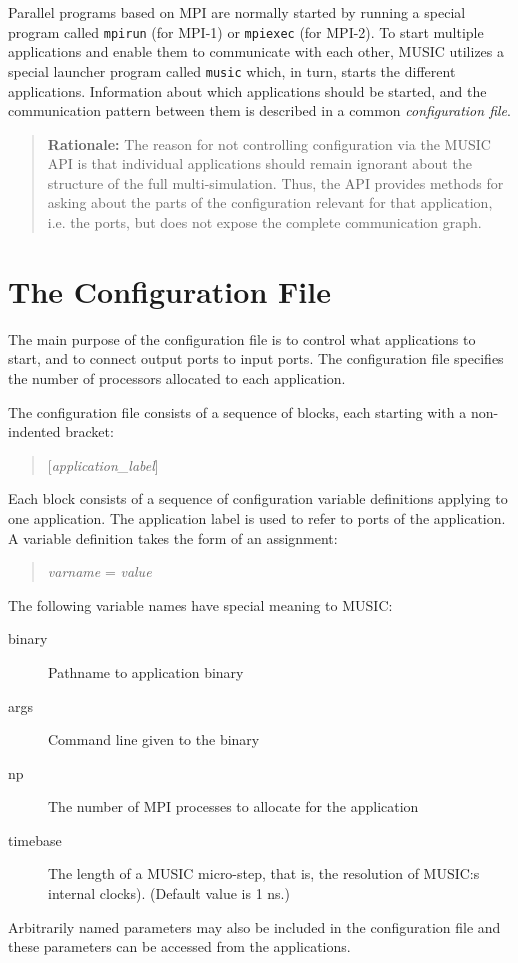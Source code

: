 \documentclass[a4paper]{report}
\newenvironment{rationale}%
{\par\begin{quote}\textbf{Rationale:}}%
{\par\end{quote}}
\begin{document}
Parallel programs based on MPI are normally started by running a
special program called \texttt{mpirun} (for MPI-1) or
\texttt{mpiexec} (for MPI-2).  To start multiple
applications and enable them to communicate with each other, MUSIC
utilizes a special launcher program called \texttt{music}
which, in turn, starts the different applications.  Information about
which applications should be started, and the communication pattern
between them is described in a common \emph{configuration
  file}.

\begin{rationale}
  The reason for not controlling configuration via the MUSIC API is
  that individual applications should remain ignorant about the
  structure of the full multi-simulation.  Thus, the API provides
  methods for asking about the parts of the configuration relevant for
  that application, i.e. the ports, but does not expose the complete
  communication graph.
\end{rationale}


\section{The Configuration File}

The main purpose of the configuration file is to control what
applications to start, and to connect output ports to input ports.
The configuration file specifies the number of processors allocated to
each application.

The configuration file consists of a sequence of blocks, each starting
with a non-indented bracket:

\begin{quote}
  [\emph{application\_label}]
\end{quote}

\noindent Each block consists of a sequence of configuration variable
definitions applying to one application.  The application label is
used to refer to ports of the application.  A variable definition
takes the form of an assignment:

\begin{quote}
  \emph{varname} = \emph{value}
\end{quote}

The following variable names have special meaning to MUSIC:
\begin{description}
  \item[binary] Pathname to application binary
  \item[args] Command line given to the binary
  \item[np] The number of MPI processes to allocate for the application
  \item[timebase] The length of a MUSIC micro-step, that is, the
    resolution of MUSIC:s internal clocks).  (Default value is 1 ns.)
\end{description}
Arbitrarily named parameters may also be included in the configuration
file and these parameters can be accessed from the applications.
\end{document}
